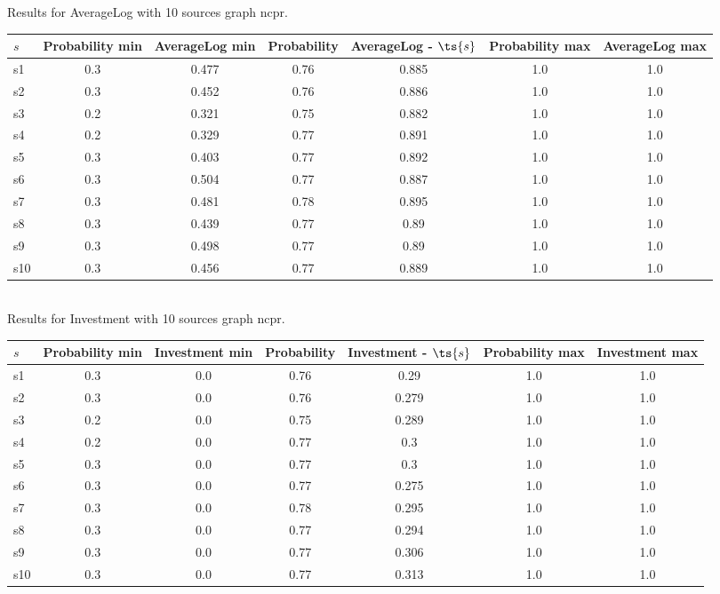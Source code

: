 \documentclass{article}
\begin{document}
\noindent Results for AverageLog with 10 sources graph ncpr.

\noindent\begin{tabular}{|l|c|c|c|c|c|c|}
\hline
$s$& Probability min & AverageLog min & Probability & AverageLog - $\ts{s}$ & Probability max & AverageLog max\\
\hline
s1 &0.3 & 0.477 & 0.76 & 0.885 & 1.0 & 1.0\\
\hline
s2 &0.3 & 0.452 & 0.76 & 0.886 & 1.0 & 1.0\\
\hline
s3 &0.2 & 0.321 & 0.75 & 0.882 & 1.0 & 1.0\\
\hline
s4 &0.2 & 0.329 & 0.77 & 0.891 & 1.0 & 1.0\\
\hline
s5 &0.3 & 0.403 & 0.77 & 0.892 & 1.0 & 1.0\\
\hline
s6 &0.3 & 0.504 & 0.77 & 0.887 & 1.0 & 1.0\\
\hline
s7 &0.3 & 0.481 & 0.78 & 0.895 & 1.0 & 1.0\\
\hline
s8 &0.3 & 0.439 & 0.77 & 0.89 & 1.0 & 1.0\\
\hline
s9 &0.3 & 0.498 & 0.77 & 0.89 & 1.0 & 1.0\\
\hline
s10 &0.3 & 0.456 & 0.77 & 0.889 & 1.0 & 1.0\\
\hline
\end{tabular}\\

\noindent Results for Investment with 10 sources graph ncpr.

\noindent\begin{tabular}{|l|c|c|c|c|c|c|}
\hline
$s$& Probability min & Investment min & Probability & Investment - $\ts{s}$ & Probability max & Investment max\\
\hline
s1 &0.3 & 0.0 & 0.76 & 0.29 & 1.0 & 1.0\\
\hline
s2 &0.3 & 0.0 & 0.76 & 0.279 & 1.0 & 1.0\\
\hline
s3 &0.2 & 0.0 & 0.75 & 0.289 & 1.0 & 1.0\\
\hline
s4 &0.2 & 0.0 & 0.77 & 0.3 & 1.0 & 1.0\\
\hline
s5 &0.3 & 0.0 & 0.77 & 0.3 & 1.0 & 1.0\\
\hline
s6 &0.3 & 0.0 & 0.77 & 0.275 & 1.0 & 1.0\\
\hline
s7 &0.3 & 0.0 & 0.78 & 0.295 & 1.0 & 1.0\\
\hline
s8 &0.3 & 0.0 & 0.77 & 0.294 & 1.0 & 1.0\\
\hline
s9 &0.3 & 0.0 & 0.77 & 0.306 & 1.0 & 1.0\\
\hline
s10 &0.3 & 0.0 & 0.77 & 0.313 & 1.0 & 1.0\\
\hline
\end{tabular}\\
\end{document}
